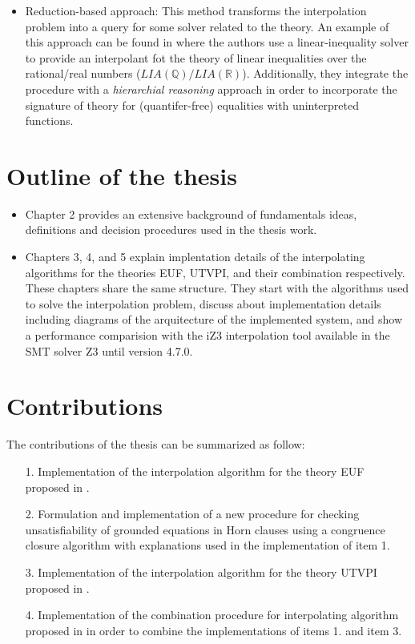 \begin{itemize}
  \item Reduction-based approach: This method transforms the interpolation
    problem into a query for some solver related to the theory. 
    An example of this approach can be found in \cite{10.1007/978-3-540-69738-1_25}
    where the authors use a linear-inequality solver to provide an interpolant
    fot the theory of linear inequalities over the rational/real numbers 
    ($LIA(\mathbb{Q})/LIA(\mathbb{R})$). 
    Additionally, they integrate the procedure with a 
    \emph{hierarchial reasoning} approach in order to incorporate 
    the signature of theory for (quantifer-free) equalities with uninterpreted 
    functions.
\end{itemize}

\section{Outline of the thesis}

\begin{itemize}
  \item Chapter 2 provides an extensive background 
    of fundamentals ideas, definitions and decision procedures 
    used in the thesis work.
  \item Chapters 3, 4, and 5 explain implentation details
    of the interpolating algorithms for the theories
    EUF, UTVPI, and their combination respectively. These
    chapters share the same structure. They start with the
    algorithms used to solve the interpolation problem, discuss
    about implementation details including diagrams
    of the arquitecture of the implemented system, and 
    show a performance comparision with the iZ3 interpolation 
    tool available in the SMT solver Z3 until version 4.7.0.
\end{itemize} 

\section{Contributions}

The contributions of the thesis can be summarized as follow:

\begin{itemize}
  \item[1.] Implementation of the interpolation algorithm for the theory EUF 
    proposed in \cite{KAPUR2017}.
  \item[2.] Formulation and implementation of a new 
    procedure for checking unsatisfiability of grounded equations in 
    Horn clauses using a congruence closure algorithm with explanations
    used in the implementation of item 1.
  \item[3.] Implementation of the interpolation algorithm for the theory UTVPI
    proposed in \cite{KAPUR2017}.
  \item[4.] Implementation of the combination procedure for interpolating
    algorithm proposed in \cite{10.1007/11532231_26} in order to 
    combine the implementations of items 1. and item 3.
\end{itemize}

